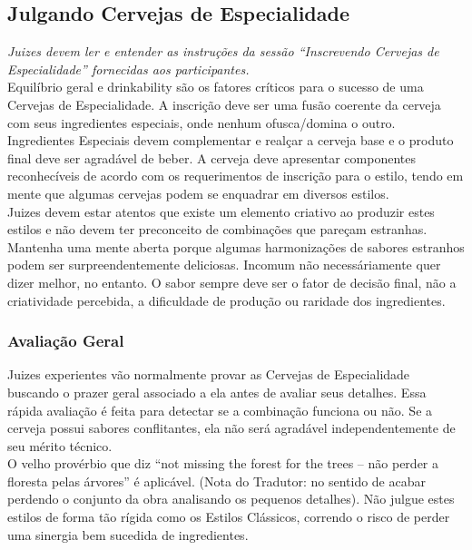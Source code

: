 \subsection*{Julgando Cervejas de Especialidade}
\textit{Juizes devem ler e entender as instruções da sessão “Inscrevendo Cervejas de Especialidade” fornecidas aos participantes.}\\
Equilíbrio geral e drinkability são os fatores críticos para o sucesso de uma Cervejas de Especialidade. A inscrição deve ser uma fusão coerente da cerveja com seus ingredientes especiais, onde nenhum ofusca/domina o outro.\\
Ingredientes Especiais devem complementar e realçar a cerveja base e o produto final deve ser agradável de beber. A cerveja deve apresentar componentes reconhecíveis de acordo com os requerimentos de inscrição para o estilo, tendo em mente que algumas cervejas podem se enquadrar em diversos estilos.\\
Juizes devem estar atentos que existe um elemento criativo ao produzir estes estilos e não devem ter preconceito de combinações que pareçam estranhas. Mantenha uma mente aberta porque algumas harmonizações de sabores estranhos podem ser surpreendentemente deliciosas. Incomum não necessáriamente quer dizer melhor, no entanto. O sabor sempre deve ser o fator de decisão final, não a criatividade percebida, a dificuldade de produção ou raridade dos ingredientes.

\subsubsection*{Avaliação Geral}
Juizes experientes vão normalmente provar as Cervejas de Especialidade buscando o prazer geral associado a ela antes de avaliar seus detalhes. Essa rápida avaliação é feita para detectar se a combinação funciona ou não. Se a cerveja possui sabores conflitantes, ela não será agradável independentemente de seu mérito técnico.\\
O velho provérbio que diz “not missing the forest for the trees – não perder a floresta pelas árvores” é aplicável. (Nota do Tradutor: no sentido de acabar perdendo o conjunto da obra analisando os pequenos detalhes). Não julgue estes estilos de forma tão rígida como os Estilos Clássicos, correndo o risco de perder uma sinergia bem sucedida de ingredientes.

